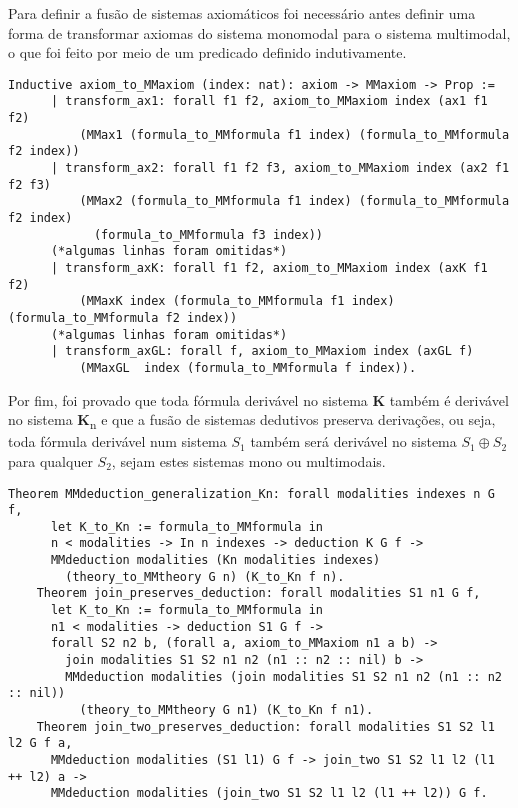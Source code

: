       Para definir a fusão de sistemas axiomáticos foi necessário antes definir uma forma de transformar axiomas do sistema monomodal para o sistema multimodal,
      o que foi feito por meio de um predicado definido indutivamente.
      \begin{lstlisting}[language=coq]
    Inductive axiom_to_MMaxiom (index: nat): axiom -> MMaxiom -> Prop :=
      | transform_ax1: forall f1 f2, axiom_to_MMaxiom index (ax1 f1 f2)
          (MMax1 (formula_to_MMformula f1 index) (formula_to_MMformula f2 index))
      | transform_ax2: forall f1 f2 f3, axiom_to_MMaxiom index (ax2 f1 f2 f3)
          (MMax2 (formula_to_MMformula f1 index) (formula_to_MMformula f2 index)
            (formula_to_MMformula f3 index))
      (*algumas linhas foram omitidas*)
      | transform_axK: forall f1 f2, axiom_to_MMaxiom index (axK f1 f2)
          (MMaxK index (formula_to_MMformula f1 index) (formula_to_MMformula f2 index))
      (*algumas linhas foram omitidas*)
      | transform_axGL: forall f, axiom_to_MMaxiom index (axGL f)
          (MMaxGL  index (formula_to_MMformula f index)).
      \end{lstlisting}

      Por fim, foi provado que toda fórmula derivável no sistema \textbf{K} também é derivável no sistema \textbf{K}\textsubscript{n} e que a fusão de sistemas dedutivos preserva
      derivações, ou seja, toda fórmula derivável num sistema \(\textit{S}_1\) também será derivável no sistema \(\textit{S}_1 \oplus \textit{S}_2\) para qualquer \(\textit{S}_2\),
      sejam estes sistemas mono ou multimodais.
      \begin{lstlisting}[language=coq]
    Theorem MMdeduction_generalization_Kn: forall modalities indexes n G f,
      let K_to_Kn := formula_to_MMformula in
      n < modalities -> In n indexes -> deduction K G f ->
      MMdeduction modalities (Kn modalities indexes)
        (theory_to_MMtheory G n) (K_to_Kn f n).
    Theorem join_preserves_deduction: forall modalities S1 n1 G f,
      let K_to_Kn := formula_to_MMformula in
      n1 < modalities -> deduction S1 G f ->
      forall S2 n2 b, (forall a, axiom_to_MMaxiom n1 a b) ->
        join modalities S1 S2 n1 n2 (n1 :: n2 :: nil) b ->
        MMdeduction modalities (join modalities S1 S2 n1 n2 (n1 :: n2 :: nil))
          (theory_to_MMtheory G n1) (K_to_Kn f n1).
    Theorem join_two_preserves_deduction: forall modalities S1 S2 l1 l2 G f a,
      MMdeduction modalities (S1 l1) G f -> join_two S1 S2 l1 l2 (l1 ++ l2) a ->
      MMdeduction modalities (join_two S1 S2 l1 l2 (l1 ++ l2)) G f.
      \end{lstlisting}

